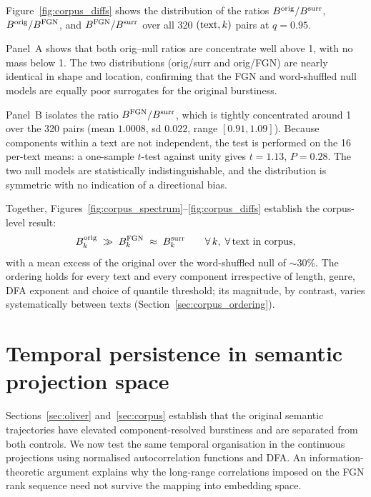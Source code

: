 \documentclass[preprint]{elsarticle}
\begin{document}
Figure~\ref{fig:corpus_diffs} shows the distribution of the ratios
$B^{\rm orig}/B^{\rm surr}$, $B^{\rm orig}/B^{\rm FGN}$, and
$B^{\rm FGN}/B^{\rm surr}$ over all 320 $({\rm text}, k)$ pairs
at $q = 0.95$.

Panel~A shows that both orig--null ratios are concentrate
well above 1, with no mass below 1.
The two distributions (orig/surr and orig/FGN) are nearly
identical in shape and location, confirming that the FGN and
word-shuffled null models are equally poor surrogates for the
original burstiness.


Panel~B isolates the ratio $B^{\rm FGN}/B^{\rm surr}$, which is tightly
concentrated around 1 over the 320 pairs (mean $1.0008$, sd $0.022$,
range $[0.91, 1.09]$). Because components within a text are not
independent, the test is performed on the 16 per-text means: a
one-sample $t$-test against unity gives $t = 1.13$, $P = 0.28$. The two
null models are statistically indistinguishable, and the distribution
is symmetric with no indication of a directional bias.

Together, Figures~\ref{fig:corpus_spectrum}--\ref{fig:corpus_diffs}
establish the corpus-level result:
\begin{equation}
  B_k^{\rm orig} \;\gg\; B_k^{\rm FGN} \;\approx\; B_k^{\rm surr}
  \qquad \forall\, k,\; \forall\, \text{text in corpus},
  \label{eq:ordering_corpus}
\end{equation}
with a mean excess of the original over the word-shuffled null of
$\sim 30\%$. The ordering holds for every text and every component
irrespective of length, genre, DFA exponent and choice of quantile
threshold; its magnitude, by contrast, varies systematically between
texts (Section~\ref{sec:corpus_ordering}).




\FloatBarrier
\section{Temporal persistence in semantic projection space}
\label{sec:entropy}

Sections~\ref{sec:oliver} and~\ref{sec:corpus} establish that the
original semantic trajectories have elevated component-resolved
burstiness and are separated from both controls. We now test the same
temporal organisation in the continuous projections using normalised
autocorrelation functions and DFA. An information-theoretic argument
explains why the long-range correlations imposed on the FGN rank
sequence need not survive the mapping into embedding space.
\end{document}
